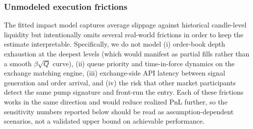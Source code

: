 \documentclass{ieeeaccess}
\begin{document}
\subsubsection{Unmodeled execution frictions}
The fitted impact model captures average slippage against historical candle-level liquidity but intentionally omits several real-world frictions in order to keep the estimate interpretable. Specifically, we do not model (i) order-book depth exhaustion at the deepest levels (which would manifest as partial fills rather than a smooth $\beta\sqrt{Q}$ curve), (ii) queue priority and time-in-force dynamics on the exchange matching engine, (iii) exchange-side API latency between signal generation and order arrival, and (iv) the risk that other market participants detect the same pump signature and front-run the entry. Each of these frictions works in the same direction and would reduce realized PnL further, so the sensitivity numbers reported below should be read as assumption-dependent scenarios, not a validated upper bound on achievable performance.

\FloatBarrier %
\end{document}
